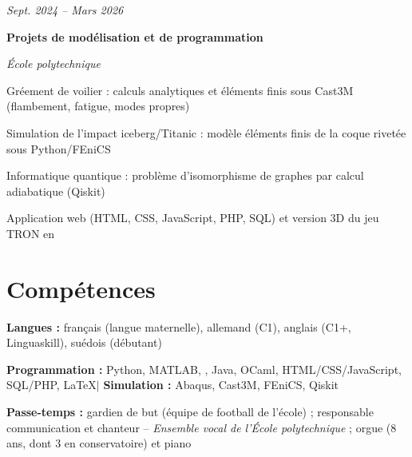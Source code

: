 \documentclass[10pt]{article}
\begin{document}
    \entrysep

    \begin{twocolentry}{

    \textit{Sept. 2024 – Mars 2026}}
        \textbf{Projets de modélisation et de programmation}

        \textit{École polytechnique}
    \end{twocolentry}

    \bulletsep
    \begin{onecolentry}
        \begin{highlights}
            \item Gréement de voilier : calculs analytiques et éléments finis sous Cast3M (flambement, fatigue, modes propres)
            \item Simulation de l'impact iceberg/Titanic : modèle éléments finis de la coque rivetée sous Python/FEniCS
            \item Informatique quantique : problème d'isomorphisme de graphes par calcul adiabatique (Qiskit)
            \item Application web (HTML, CSS, JavaScript, PHP, SQL) et version 3D du jeu TRON en \cpp
        \end{highlights}
    \end{onecolentry}


\section{Compétences}

    \begin{onecolentry}
        \textbf{Langues :} français (langue maternelle), allemand (C1), anglais (C1+, Linguaskill), suédois (débutant)
    \end{onecolentry}

    \bulletsep

    \begin{onecolentry}
        \textbf{Programmation :} Python, MATLAB, \cpp, Java, OCaml, HTML/CSS/JavaScript, SQL/PHP, \LaTeX \quad $|$ \quad \textbf{Simulation :} Abaqus, Cast3M, FEniCS, Qiskit
    \end{onecolentry}

    \bulletsep

    \begin{onecolentry}
        \textbf{Passe-temps :} gardien de but (équipe de football de l'école) ; responsable communication et chanteur -- \textit{Ensemble vocal de l'École polytechnique} ; orgue (8 ans, dont 3 en conservatoire) et piano
    \end{onecolentry}
\end{document}
